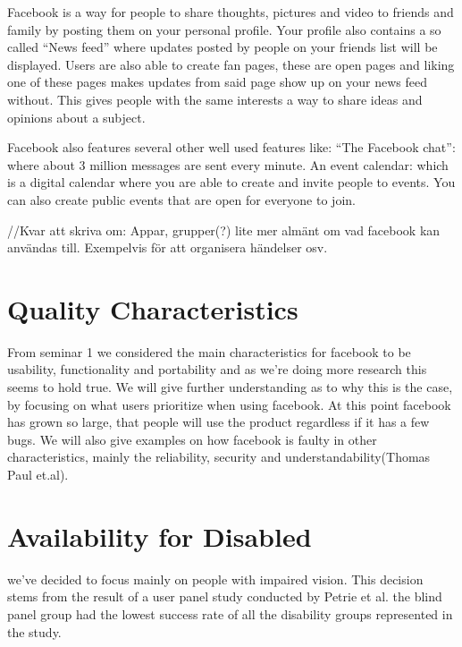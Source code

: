 \documentclass[conference]{IEEEtran}
\begin{document}
Facebook is a way for people to share thoughts, pictures and video to friends
and family by posting them on your personal profile. Your profile also contains
a so called “News feed” where updates posted by people on your friends list
will be displayed. Users are also able to create fan pages, these are open
pages and liking one of these pages makes updates from said page show up on
your news feed without. This gives people with the same interests a way to
share ideas and opinions about a subject.


Facebook also features several other well used features like:
“The Facebook chat”: where about  3 million messages are sent every minute.
An event calendar: which is a digital calendar where you are able to create and
invite people to events. You can also create public events that are open for
everyone to join.

//Kvar att skriva om: Appar, grupper(?) lite mer almänt om vad facebook kan
användas till. Exempelvis för att organisera händelser osv.  


\section{Quality Characteristics}
\label{quality}
From seminar 1 we considered the main characteristics for facebook to be
usability, functionality and portability and as we’re doing more research this
seems to hold true. We will give further understanding as to why this is the
case, by focusing on what users prioritize when using facebook. At this point
facebook has grown so large, that people will use the product regardless if it
has a few bugs. We will also give examples on how facebook is faulty in other
characteristics, mainly the reliability, security and understandability(Thomas
Paul et.al).


\section{Availability for Disabled}
\label{availability}
we’ve decided to focus mainly on people with impaired vision. This decision
stems from the result of a user panel study conducted by Petrie et al. the
blind panel group had the lowest success rate of all the disability groups
represented in the study.  
\end{document}
